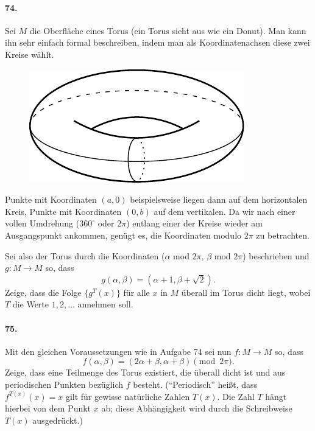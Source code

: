\documentclass[10pt,a5paper,twoside]{article}
\newenvironment{problem}[1]{\paragraph*{#1}}{}
\begin{document}
\begin{problem}{74.}
	Sei $M$ die Oberfläche eines Torus (ein Torus sieht aus wie ein Donut). Man kann ihn sehr einfach formal beschreiben, indem man als Koordinatenachsen diese zwei Kreise wählt. 
	\begin{figure}[H]
	\centering
	\includegraphics{74_torus} 
	\end{figure}

	Punkte mit Koordinaten $(a,0)$ beispielsweise liegen dann auf dem horizontalen Kreis, Punkte mit Koordinaten $(0,b)$ auf dem vertikalen. 
	Da wir nach einer vollen Umdrehung ($360^\circ$ oder $2\pi$) entlang einer der Kreise wieder am Ausgangspunkt ankommen, genügt es, die Koordinaten modulo $2\pi$ zu betrachten.
	
	Sei also der Torus durch die Koordinaten ($\alpha$ mod $2\pi$, $\beta$ mod $2\pi$) beschrieben und $g: M\to M$ so, dass
	\begin{equation*}
		g(\alpha, \beta)=(\alpha+1, \beta+ \sqrt{2}).
	\end{equation*}
	Zeige, dass die Folge $\{g^T (x)\}$ für alle $x$ in $M$ überall im Torus dicht liegt, wobei $T$ die Werte $1,2,\dots$ annehmen soll. 

\end{problem}

\begin{problem}{75.}
Mit den gleichen Voraussetzungen wie in Aufgabe 74 sei nun $f: M\to M$ so, dass
\begin{equation*}
f(\alpha, \beta)=(2\alpha+\beta,\alpha+\beta) \pmod {2\pi}.
\end{equation*}
Zeige, dass eine Teilmenge des Torus existiert, die überall dicht ist und aus periodischen Punkten bezüglich $f$ besteht. 
(\enquote{Periodisch} heißt, dass $f^{T (x)} (x)=x$ gilt für gewisse natürliche Zahlen $T(x)$. Die Zahl $T$ hängt hierbei von dem Punkt $x$ ab; diese Abhängigkeit wird durch die Schreibweise $T(x)$ ausgedrückt.)


\end{problem}
\end{document}
